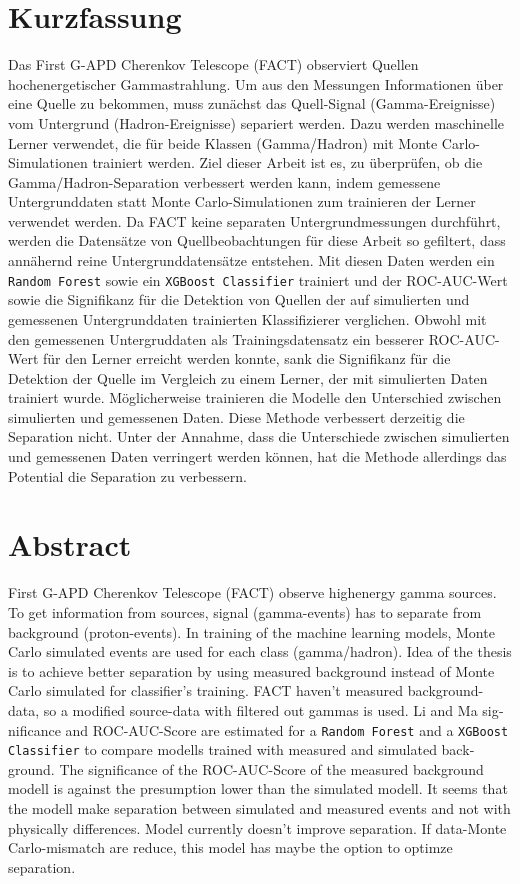 \thispagestyle{plain}

\section*{Kurzfassung}
Das First G-APD Cherenkov Telescope (FACT) observiert Quellen hochenergetischer Gammastrahlung.
Um aus den Messungen Informationen über eine Quelle zu bekommen, muss zunächst das Quell-Signal (Gamma-Ereignisse) vom Untergrund (Hadron-Ereignisse) separiert werden.
Dazu werden maschinelle Lerner verwendet, die für beide Klassen (Gamma/Hadron) mit Monte Carlo-Simulationen trainiert werden.
Ziel dieser Arbeit ist es, zu überprüfen, ob die Gamma/Hadron-Separation verbessert werden kann, indem gemessene Untergrunddaten statt Monte Carlo-Simulationen zum trainieren der Lerner verwendet werden.
Da FACT keine separaten Untergrundmessungen durchführt, werden die Datensätze von Quellbeobachtungen für diese Arbeit so gefiltert, dass annähernd reine Untergrunddatensätze entstehen.
Mit diesen Daten werden ein \texttt{Random Forest} sowie ein \texttt{XGBoost Classifier} trainiert und der ROC-AUC-Wert sowie die Signifikanz für die Detektion von Quellen der auf simulierten und gemessenen Untergrunddaten trainierten Klassifizierer verglichen. 
Obwohl mit den gemessenen Untergruddaten als Trainingsdatensatz ein besserer ROC-AUC-Wert für den Lerner erreicht werden konnte, sank die Signifikanz für die Detektion der Quelle im Vergleich zu einem Lerner, der mit simulierten Daten trainiert wurde. 
Möglicherweise trainieren die Modelle den Unterschied zwischen simulierten und gemessenen Daten. 
Diese Methode verbessert derzeitig die Separation nicht. 
Unter der Annahme, dass die Unterschiede zwischen simulierten und gemessenen Daten verringert werden können, hat die Methode allerdings das Potential die Separation zu verbessern. 
\section*{Abstract}
\begin{english}
First G-APD Cherenkov Telescope (FACT) observe highenergy gamma sources.
To get information from sources, signal (gamma-events) has to separate from background (proton-events). 
In training of the machine learning models, Monte Carlo simulated events are used for each class (gamma/hadron).
Idea of the thesis is to achieve better separation by using measured background instead of Monte Carlo simulated for classifier's training.
FACT haven't measured background-data, so a modified source-data with filtered out gammas is used.
Li and Ma significance and ROC-AUC-Score are estimated for a \texttt{Random Forest} and a \texttt{XGBoost Classifier} to compare modells trained with measured and simulated background.
The significance of the ROC-AUC-Score of the measured background modell is against the presumption lower than the simulated modell.
It seems that the modell make separation between simulated and measured events and not with physically differences.
Model currently doesn't improve separation.
If data-Monte Carlo-mismatch are reduce, this model has maybe the option to optimze separation.
\end{english}
